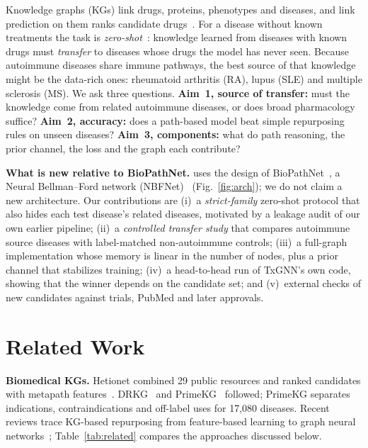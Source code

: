\documentclass[conference]{IEEEtran}
\begin{document}
Knowledge graphs (KGs) link drugs, proteins, phenotypes and diseases, and link prediction on them ranks candidate drugs~\cite{himmelstein2017hetionet,bonner2022review}. For a disease without known treatments the task is \emph{zero-shot}~\cite{huang2024txgnn}: knowledge learned from diseases with known drugs must \emph{transfer} to diseases whose drugs the model has never seen. Because autoimmune diseases share immune pathways, the best source of that knowledge might be the data-rich ones: rheumatoid arthritis (RA), lupus (SLE) and multiple sclerosis (MS). We ask three questions. \textbf{Aim~1, source of transfer:} must the knowledge come from related autoimmune diseases, or does broad pharmacology suffice? \textbf{Aim~2, accuracy:} does a path-based model beat simple repurposing rules on unseen diseases? \textbf{Aim~3, components:} what do path reasoning, the prior channel, the loss and the graph each contribute?

\textbf{What is new relative to BioPathNet.} \sysname uses the design of BioPathNet~\cite{hu2026biopathnet}, a Neural Bellman--Ford network (NBFNet)~\cite{zhu2021nbfnet} (Fig.~\ref{fig:arch}); we do not claim a new architecture. Our contributions are (i)~a \emph{strict-family} zero-shot protocol that also hides each test disease's related diseases, motivated by a leakage audit of our own earlier pipeline; (ii)~a \emph{controlled transfer study} that compares autoimmune source diseases with label-matched non-autoimmune controls; (iii)~a full-graph implementation whose memory is linear in the number of nodes, plus a prior channel that stabilizes training; (iv)~a head-to-head run of TxGNN's own code, showing that the winner depends on the candidate set; and (v)~external checks of new candidates against trials, PubMed and later approvals.

\section{Related Work}
\textbf{Biomedical KGs.} Hetionet combined 29 public resources and ranked candidates with metapath features~\cite{himmelstein2017hetionet}. DRKG~\cite{drkg2020} and PrimeKG~\cite{chandak2023primekg} followed; PrimeKG separates indications, contraindications and off-label uses for 17,080 diseases. Recent reviews trace KG-based repurposing from feature-based learning to graph neural networks~\cite{wei2025kgreview,kumar2025scoping}; Table~\ref{tab:related} compares the approaches discussed below.
\end{document}
